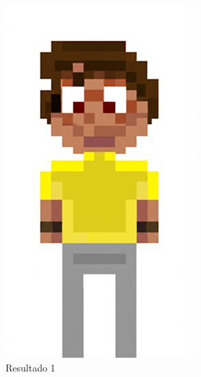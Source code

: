\begin{figure}[htbp]
\begin{subfigure}{0.3\linewidth}
        \includegraphics[width=1\linewidth]{figs/geminiPro/chat12/01res1.PNG}
        \caption{\small Resultado 1}
        \label{fig:geminiProBack1a}
    \end{subfigure}
    \begin{subfigure}{0.3\linewidth}

\end{subfigure}
\end{figure}
